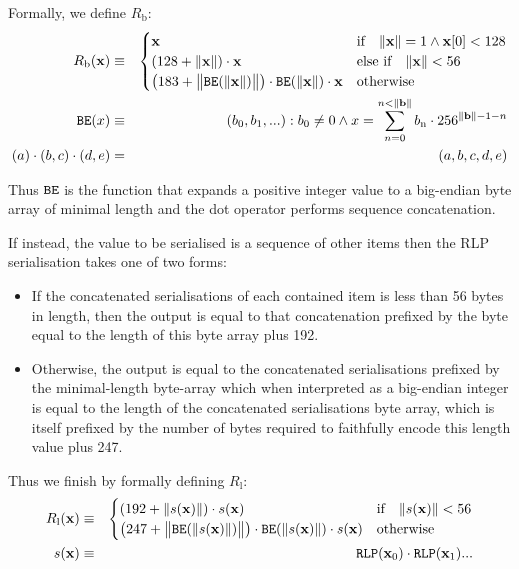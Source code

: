 \documentclass[9pt,oneside]{amsart}
\makeatletter
\newcommand{\linkdest}[1]{\Hy@raisedlink{\hypertarget{#1}{}}}
\makeatother
\begin{document}
\hypertarget{RLP_serialisation_of_a_byte_array_R__b_math_def}{}Formally, we define $R_{\mathrm{b}}$:
\begin{eqnarray}
R_{\mathrm{b}}(\mathbf{x}) & \equiv & \begin{cases}
\mathbf{x} & \text{if} \quad \lVert \mathbf{x} \rVert = 1 \wedge \mathbf{x}[0] < 128 \\
(128 + \lVert \mathbf{x} \rVert) \cdot \mathbf{x} & \text{else if} \quad \lVert \mathbf{x} \rVert < 56 \\
\big(183 + \big\lVert \mathtt{\tiny BE}(\lVert \mathbf{x} \rVert) \big\rVert \big) \cdot \mathtt{\tiny BE}(\lVert \mathbf{x} \rVert) \cdot \mathbf{x} & \text{otherwise}
\end{cases} \\
\mathtt{\tiny BE}(x) & \equiv & (b_0, b_1, ...): b_0 \neq 0 \wedge x = \sum_{n = 0}^{n < \lVert \mathbf{b} \rVert} b_{\mathrm{n}} \cdot 256^{\lVert \mathbf{b} \rVert - 1 - n} \\
(a) \cdot (b, c) \cdot (d, e) & = & (a, b, c, d, e)
\end{eqnarray}

Thus $\mathtt{\tiny BE}$ is the function that expands a positive integer value to a big-endian byte array of minimal length and the dot operator performs sequence concatenation.

\hypertarget{RLP_serialisation_of_a_sequence_of_other_items_R__l_word_def}{}\linkdest{R__l}If instead, the value to be serialised is a sequence of other items then the RLP serialisation takes one of two forms:

\begin{itemize}
\item If the concatenated serialisations of each contained item is less than 56 bytes in length, then the output is equal to that concatenation prefixed by the byte equal to the length of this byte array plus 192.
\item Otherwise, the output is equal to the concatenated serialisations prefixed by the minimal-length byte-array which when interpreted as a big-endian integer is equal to the length of the concatenated serialisations byte array, which is itself prefixed by the number of bytes required to faithfully encode this length value plus 247.
\end{itemize}

\hypertarget{RLP_serialisation_of_a_sequence_of_other_items_R__l_math_def}{}Thus we finish by formally defining $R_{\mathrm{l}}$:
\begin{eqnarray}
R_{\mathrm{l}}(\mathbf{x}) & \equiv & \begin{cases}
(192 + \lVert s(\mathbf{x}) \rVert) \cdot s(\mathbf{x}) & \text{if} \quad \lVert s(\mathbf{x}) \rVert < 56 \\
\big(247 + \big\lVert \mathtt{\tiny BE}(\lVert s(\mathbf{x}) \rVert) \big\rVert \big) \cdot \mathtt{\tiny BE}(\lVert s(\mathbf{x}) \rVert) \cdot s(\mathbf{x}) & \text{otherwise}
\end{cases} \\
s(\mathbf{x}) & \equiv & \mathtt{\tiny RLP}(\mathbf{x}_0) \cdot \mathtt{\tiny RLP}(\mathbf{x}_1) ...
\end{eqnarray}
\end{document}
